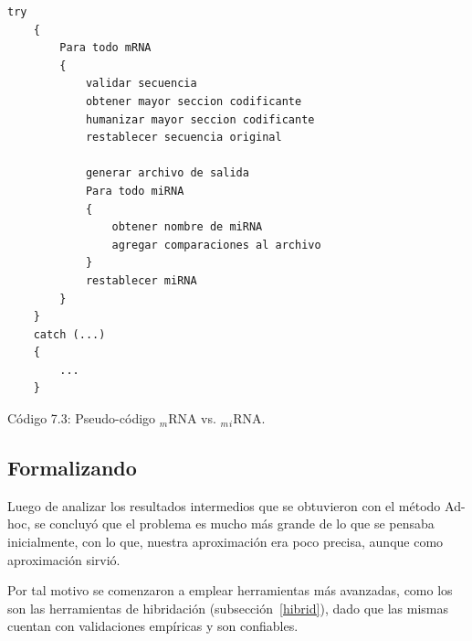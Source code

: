 \begin{minipage}{\linewidth}
	\begin{lstlisting}[basicstyle=\tt, frame=trBL, tabsize=4,fontadjust=true]
	try
	{
		Para todo mRNA
		{
			validar secuencia
			obtener mayor seccion codificante
			humanizar mayor seccion codificante
			restablecer secuencia original

			generar archivo de salida
			Para todo miRNA
			{
				obtener nombre de miRNA
				agregar comparaciones al archivo
			}
			restablecer miRNA
		}
	}
	catch (...)
	{
		...
	}
	\end{lstlisting}
\end{minipage}
\hspace*{3cm}\caption{Código 7.3: Pseudo-código $_m$RNA vs. $_m$$_i$RNA.}

\subsection{Formalizando}
\par Luego de analizar los resultados intermedios que se obtuvieron con el método Ad-hoc, se concluyó que el problema es mucho más grande de lo que se pensaba inicialmente, con lo que, nuestra aproximación era poco precisa, aunque como aproximación sirvió. 
\par Por tal motivo se comenzaron a emplear herramientas más avanzadas, como los son las herramientas de hibridación (subsección~\ref{hibrid}), dado que las mismas cuentan con validaciones empíricas y son confiables.

